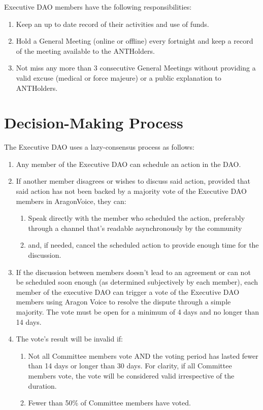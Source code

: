 Executive \ac{DAO} members have the following responsibilities:
\begin{enumerate}
	\item Keep an up to date record of their activities and use of funds.
	\item Hold a General Meeting (online or offline) every fortnight and keep a record of the meeting available to the \glspl{ANTHolder}.
	\item Not miss any more than 3 consecutive General Meetings without providing a valid excuse (medical or force majeure) or a public explanation to \glspl{ANTHolder}.
\end{enumerate}


\section{Decision-Making Process} 

The Executive \ac{DAO} uses a lazy-consensus process as follows:
\begin{enumerate}
	
	\item Any member of the Executive \ac{DAO} can schedule an action in the \ac{DAO}.
	\item If another member disagrees or wishes to discuss said action, provided that said action has not been backed by a majority vote of the Executive \ac{DAO} members in \gls{AragonVoice}, they can:
	\begin{enumerate}
		\item Speak directly with the member who scheduled the action, preferably through a channel that’s readable asynchronously by the community
		\item and, if needed, cancel the scheduled action to provide enough time for the discussion.
	\end{enumerate}
	
	\item If the discussion between members doesn’t lead to an agreement or can not be scheduled soon enough (as determined subjectively by each member), each member of the executive \ac{DAO} can trigger a vote of the Executive \ac{DAO} members using Aragon Voice to resolve the dispute through a simple majority.
	The vote must be open for a minimum of 4 days and no longer than 14 days.
	\item The vote’s result will be invalid if:
	\begin{enumerate}
		\item Not all Committee members vote AND the voting period has lasted fewer than 14 days or longer than 30 days.
		For clarity, if all Committee members vote, the vote will be considered valid irrespective of the duration.
		\item Fewer than 50\% of Committee members have voted.
	\end{enumerate}

\end{enumerate}


